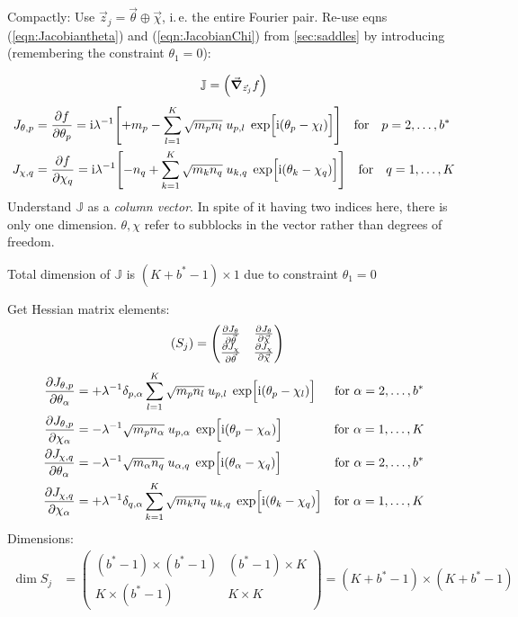 \documentclass[
	english,
	a4paper,
	fontsize=10pt,
	parskip=half,
	titlepage=true,
	DIV=12,
	final
]{scrreprt}
\newcommand*{\ie}{i.\,e.\xspace}
\newcommand*{\iunit}{\ensuremath{\mathrm{i}}}
\begin{document}
Compactly: Use $\vec{z}_j = \vec{\theta} \oplus \vec{\chi}$, \ie the entire Fourier pair. Re-use eqns (\ref{eqn:Jacobiantheta}) and (\ref{eqn:JacobianChi}) from \ref{sec:saddles} by introducing (remembering the constraint $\theta_1 = 0$):

\begin{align}
	\mathbb{J} = \qty( \grad_{\vec{z}_j} f )
\end{align}
\begin{align}
	J_{\theta, p} 
&= 
	\pdv{f}{\theta_p}
=
	\iunit \lambda^{-1}
	\qty[
		+m_p
		-
		\sum_{l=1}^{K}
			\sqrt{m_p n_l} \; u_{p,l} \; \exp[\Big. \iunit(\theta_p - \chi_l)]
	]
\qfor{} p = 2, \ldots, b^*
\\
	J_{\chi, q} 
&= 
	\pdv{f}{\chi_q}
=
	\iunit \lambda^{-1}
	\qty[
		-n_q
		+
		\sum_{k=1}^{K}
			\sqrt{m_k n_q} \; u_{k,q} \; \exp[\Big. \iunit(\theta_k - \chi_q)]
	]
\qfor{} q = 1, \ldots, K
\end{align}
Understand $\mathbb{J}$ as a \emph{column vector}. In spite of it having two indices here, there is only one dimension. $\theta, \chi$ refer to subblocks in the vector rather than degrees of freedom.

Total dimension of $\mathbb{J}$ is $(K + b^* - 1) \times 1$ due to constraint $\theta_1 = 0$

Get Hessian matrix elements:
\begin{align}
	\qty( S_j )
&=
	\begin{pmatrix}
		\pdv{J_{\theta}}{\vec{\theta}} &
		\pdv{J_{\theta}}{\vec{\chi  }} 
		\\
		\pdv{J_{\chi  }}{\vec{\theta}} &
		\pdv{J_{\chi  }}{\vec{\chi  }} 
	\end{pmatrix}
\end{align}
\begin{align}
	\pdv{J_{\theta, p}}{\theta_{\alpha}}
&=
	+
	\lambda^{-1}
	\delta_{p,\alpha}
	\sum_{l=1}^{K}
		\sqrt{m_p n_l} \; u_{p,l} \; \exp[\Big. \iunit(\theta_p - \chi_l)]
&\text{for } \alpha = 2, \ldots, b^*
\\
	\pdv{J_{\theta, p}}{\chi_{\alpha}}
&=
	-
	\lambda^{-1}
	\sqrt{m_p n_\alpha} \; u_{p,\alpha} \; \exp[\Big. \iunit(\theta_p - \chi_\alpha)]
&\text{for } \alpha = 1, \ldots, K
\\
	\pdv{J_{\chi, q}}{\theta_{\alpha}}
&=
	-
	\lambda^{-1}
	\sqrt{m_\alpha n_q} \; u_{\alpha,q} \; \exp[\Big. \iunit(\theta_\alpha - \chi_q)]
&\text{for } \alpha = 2, \ldots, b^*
\\
	\pdv{J_{\chi, q}}{\chi_{\alpha}}
&=
	+
	\lambda^{-1}
	\delta_{q,\alpha}
	\sum_{k=1}^{K}
		\sqrt{m_k n_q} \; u_{k,q} \; \exp[\Big. \iunit(\theta_k - \chi_q)]
&\text{for } \alpha = 1, \ldots, K
\end{align}
Dimensions:
\begin{align}
	\dim S_j
&=
	\begin{pmatrix}
		(b^* - 1) \times (b^* - 1)	& (b^* - 1) \times K \\
		K \times (b^* - 1)			& K \times K
	\end{pmatrix}
=
	(K + b^* - 1) \times (K + b^* - 1)
\end{align}
\end{document}
